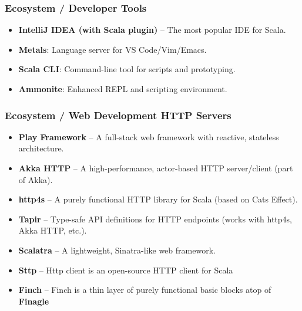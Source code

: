 \documentclass{beamer}
\begin{document}

\begin{frame}
\frametitle{Ecosystem / Developer Tools }
 \begin{itemize}
  \item \textbf{IntelliJ IDEA (with Scala plugin)} – The most popular IDE for Scala.
  \item \textbf{Metals}: Language server for VS Code/Vim/Emacs.
  \item \textbf{Scala CLI}: Command-line tool for scripts and prototyping.
  \item \textbf{Ammonite}: Enhanced REPL and scripting environment.
\end{itemize}
\end{frame}


\begin{frame}
\frametitle{Ecosystem / Web Development \text{\&} HTTP Servers }

\begin{itemize}
    \item \textbf{Play Framework} – A full-stack web framework with reactive, stateless architecture.
    \item \textbf{Akka HTTP} – A high-performance, actor-based HTTP server/client (part of Akka).
    \item \textbf{http4s} – A purely functional HTTP library for Scala (based on Cats Effect).
    \item \textbf{Tapir} – Type-safe API definitions for HTTP endpoints (works with http4s, Akka HTTP, etc.).
    \item \textbf{Scalatra} – A lightweight, Sinatra-like web framework.
    \item \textbf{Sttp} – Http client is an open-source HTTP client for Scala
    \item \textbf{Finch} – Finch is a thin layer of purely functional basic blocks atop of \textbf{Finagle}
\end{itemize}

\end{frame}
\end{document}
